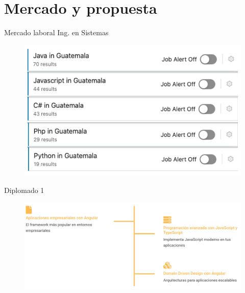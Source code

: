 \documentclass[aspectratio=169]{beamer}
\begin{document}
{
	\section{Mercado y propuesta}
}


\begin{frame}[fragile]{Mercado laboral Ing. en Sistemas}
	\begin{figure}
		\centering
		\includegraphics[width=0.9\linewidth]{Images/trabajos}
	\end{figure}

\end{frame}

\begin{frame}[fragile]{Diplomado 1}
	\begin{figure}
		\centering
		\includegraphics[width=\linewidth]{Images/frontend}
	\end{figure}
	
\end{frame}
\end{document}

